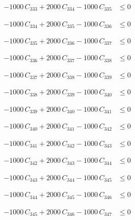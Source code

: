\documentclass[a4paper,11pt]{article}
\begin{document}
\begin{align}
-1000\,C_{333} + 2000\,C_{334} - 1000\,C_{335} &\leq 0 \nonumber
\end{align}

\begin{align}
-1000\,C_{334} + 2000\,C_{335} - 1000\,C_{336} &\leq 0 \nonumber
\end{align}

\begin{align}
-1000\,C_{335} + 2000\,C_{336} - 1000\,C_{337} &\leq 0 \nonumber
\end{align}

\begin{align}
-1000\,C_{336} + 2000\,C_{337} - 1000\,C_{338} &\leq 0 \nonumber
\end{align}

\begin{align}
-1000\,C_{337} + 2000\,C_{338} - 1000\,C_{339} &\leq 0 \nonumber
\end{align}

\begin{align}
-1000\,C_{338} + 2000\,C_{339} - 1000\,C_{340} &\leq 0 \nonumber
\end{align}

\begin{align}
-1000\,C_{339} + 2000\,C_{340} - 1000\,C_{341} &\leq 0 \nonumber
\end{align}

\begin{align}
-1000\,C_{340} + 2000\,C_{341} - 1000\,C_{342} &\leq 0 \nonumber
\end{align}

\begin{align}
-1000\,C_{341} + 2000\,C_{342} - 1000\,C_{343} &\leq 0 \nonumber
\end{align}

\begin{align}
-1000\,C_{342} + 2000\,C_{343} - 1000\,C_{344} &\leq 0 \nonumber
\end{align}

\begin{align}
-1000\,C_{343} + 2000\,C_{344} - 1000\,C_{345} &\leq 0 \nonumber
\end{align}

\begin{align}
-1000\,C_{344} + 2000\,C_{345} - 1000\,C_{346} &\leq 0 \nonumber
\end{align}

\begin{align}
-1000\,C_{345} + 2000\,C_{346} - 1000\,C_{347} &\leq 0 \nonumber
\end{align}
\end{document}

